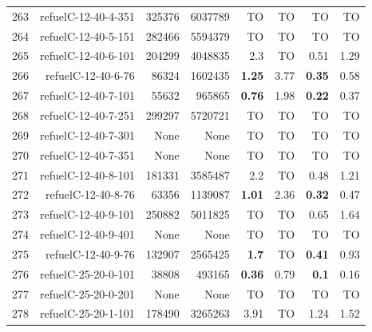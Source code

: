 \begin{longtable}{lrr@{\hskip 12pt}r@{\hskip 12pt}r@{\hskip 12pt}r@{\hskip 12pt}r@{\hskip 12pt}r}
263 & \multirow{1}{*}{refuelC-12-40-4-351} & \multirow{1}{*}{325376} & \multirow{1}{*}{6037789} & TO & TO & TO & TO \\
264 & \multirow{1}{*}{refuelC-12-40-5-151} & \multirow{1}{*}{282466} & \multirow{1}{*}{5594379} & TO & TO & TO & TO \\
265 & \multirow{1}{*}{refuelC-12-40-6-101} & \multirow{1}{*}{204299} & \multirow{1}{*}{4048835} & 2.3 & TO & 0.51 & 1.29 \\
266 & \multirow{1}{*}{refuelC-12-40-6-76} & \multirow{1}{*}{86324} & \multirow{1}{*}{1602435} & \textbf{1.25} & 3.77 & \textbf{0.35} & 0.58 \\
267 & \multirow{1}{*}{refuelC-12-40-7-101} & \multirow{1}{*}{55632} & \multirow{1}{*}{965865} & \textbf{0.76} & 1.98 & \textbf{0.22} & 0.37 \\
268 & \multirow{1}{*}{refuelC-12-40-7-251} & \multirow{1}{*}{299297} & \multirow{1}{*}{5720721} & TO & TO & TO & TO \\
269 & \multirow{1}{*}{refuelC-12-40-7-301} & \multirow{1}{*}{None} & \multirow{1}{*}{None} & TO & TO & TO & TO \\
270 & \multirow{1}{*}{refuelC-12-40-7-351} & \multirow{1}{*}{None} & \multirow{1}{*}{None} & TO & TO & TO & TO \\
271 & \multirow{1}{*}{refuelC-12-40-8-101} & \multirow{1}{*}{181331} & \multirow{1}{*}{3585487} & 2.2 & TO & 0.48 & 1.21 \\
272 & \multirow{1}{*}{refuelC-12-40-8-76} & \multirow{1}{*}{63356} & \multirow{1}{*}{1139087} & \textbf{1.01} & 2.36 & \textbf{0.32} & 0.47 \\
273 & \multirow{1}{*}{refuelC-12-40-9-101} & \multirow{1}{*}{250882} & \multirow{1}{*}{5011825} & TO & TO & 0.65 & 1.64 \\
274 & \multirow{1}{*}{refuelC-12-40-9-401} & \multirow{1}{*}{None} & \multirow{1}{*}{None} & TO & TO & TO & TO \\
275 & \multirow{1}{*}{refuelC-12-40-9-76} & \multirow{1}{*}{132907} & \multirow{1}{*}{2565425} & \textbf{1.7} & TO & \textbf{0.41} & 0.93 \\
276 & \multirow{1}{*}{refuelC-25-20-0-101} & \multirow{1}{*}{38808} & \multirow{1}{*}{493165} & \textbf{0.36} & 0.79 & \textbf{0.1} & 0.16 \\
277 & \multirow{1}{*}{refuelC-25-20-0-201} & \multirow{1}{*}{None} & \multirow{1}{*}{None} & TO & TO & TO & TO \\
278 & \multirow{1}{*}{refuelC-25-20-1-101} & \multirow{1}{*}{178490} & \multirow{1}{*}{3265263} & 3.91 & TO & 1.24 & 1.52 \\

\end{longtable}
